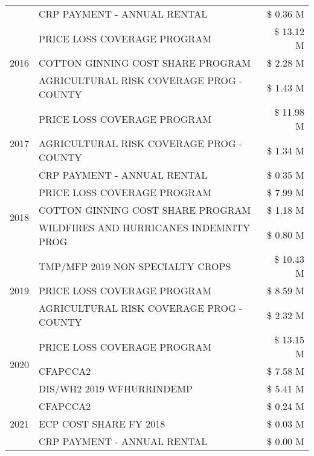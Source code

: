 \begin{tabular}{llr}
 & CRP PAYMENT - ANNUAL RENTAL & \$ 0.36 M \\
\cline{1-3}
\multirow[t]{3}{*}{2016} & PRICE LOSS COVERAGE PROGRAM                   & \$ 13.12 M \\
 & COTTON GINNING COST SHARE PROGRAM             & \$ 2.28 M \\
 & AGRICULTURAL RISK COVERAGE PROG - COUNTY      & \$ 1.43 M \\
\cline{1-3}
\multirow[t]{3}{*}{2017} & PRICE LOSS COVERAGE PROGRAM & \$ 11.98 M \\
 & AGRICULTURAL RISK COVERAGE PROG - COUNTY & \$ 1.34 M \\
 & CRP PAYMENT - ANNUAL RENTAL & \$ 0.35 M \\
\cline{1-3}
\multirow[t]{3}{*}{2018} & PRICE LOSS COVERAGE PROGRAM & \$ 7.99 M \\
 & COTTON GINNING COST SHARE PROGRAM & \$ 1.18 M \\
 & WILDFIRES AND HURRICANES INDEMNITY PROG & \$ 0.80 M \\
\cline{1-3}
\multirow[t]{3}{*}{2019} & TMP/MFP 2019 NON SPECIALTY CROPS & \$ 10.43 M \\
 & PRICE LOSS COVERAGE PROGRAM & \$ 8.59 M \\
 & AGRICULTURAL RISK COVERAGE PROG - COUNTY & \$ 2.32 M \\
\cline{1-3}
\multirow[t]{3}{*}{2020} & PRICE LOSS COVERAGE PROGRAM & \$ 13.15 M \\
 & CFAPCCA2 & \$ 7.58 M \\
 & DIS/WH2 2019 WFHURRINDEMP & \$ 5.41 M \\
\cline{1-3}
\multirow[t]{3}{*}{2021} & CFAPCCA2 & \$ 0.24 M \\
 & ECP COST SHARE FY 2018 & \$ 0.03 M \\
 & CRP PAYMENT - ANNUAL RENTAL & \$ 0.00 M \\
\cline{1-3}
\bottomrule
\end{tabular}
